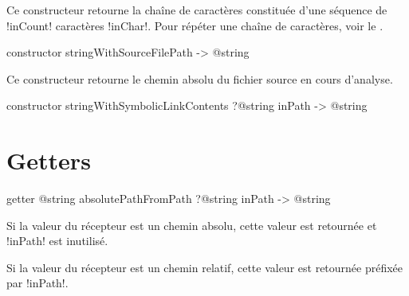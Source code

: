 Ce constructeur retourne la chaîne de caractères constituée d'une séquence de \ggst!inCount! caractères \ggst!inChar!. Pour répéter une chaîne de caractères, voir le .






\begin{galgas3box}
constructor stringWithSourceFilePath -> @string
\end{galgas3box}

Ce constructeur retourne le chemin absolu du fichier source en cours d'analyse.







\begin{galgas3box}
constructor stringWithSymbolicLinkContents ?@string inPath -> @string
\end{galgas3box}



















\section{Getters}



\begin{galgas3box}
getter @string absolutePathFromPath ?@string inPath -> @string
\end{galgas3box}

Si la valeur du récepteur est un chemin absolu, cette valeur est retournée et \ggst!inPath! est inutilisé.

Si la valeur du récepteur est un chemin relatif, cette valeur est retournée préfixée par \ggst!inPath!.





